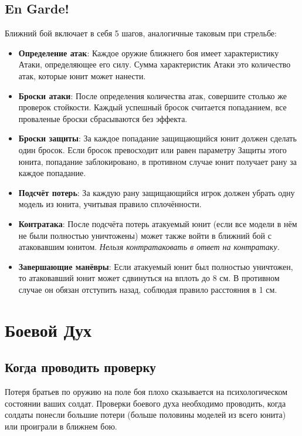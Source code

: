 \documentclass[twocolumn]{article}
\newcommand{\h}[1]{\textbf{#1}}
\begin{document}
\subsection{En Garde!}
Ближний бой включает в себя 5 шагов, аналогичные таковым при стрельбе:
\begin{itemize}
    \item \h{Определение атак}: Каждое оружие ближнего боя имеет характеристику Атаки, определяющее его силу. Сумма характеристик Атаки это количество атак, которые юнит может нанести.
    \item \h{Броски атаки}: После определения количества атак, совершите столько же проверок стойкости. Каждый успешный бросок считается попаданием, все проваленые броски сбрасываются без эффекта.
    \item \h{Броски защиты}: За каждое попадание защищающийся юнит должен сделать один бросок. Если бросок превосходит или равен параметру Защиты этого юнита, попадание заблокировано, в противном случае юнит получает рану за каждое попадание.
    \item \h{Подсчёт потерь}: За каждую рану защищающийся игрок должен убрать одну модель из юнита, учитывая правило сплочённости.
    \item \h{Контратака}: После подсчёта потерь атакуемый юнит (если все модели в нём не были полностью уничтожены) может также войти в ближний бой с атаковавшим юнитом. \emph{Нельзя контратаковать в ответ на контратаку.}
    \item \h{Завершающие манёвры}: Если атакуемый юнит был полностью уничтожен, то атаковавший юнит может сдвинуться на вплоть до 8 см. В противном случае он обязан отступить назад, соблюдая правило расстояния в 1 см.
\end{itemize}

\newpage

\section{Боевой Дух}
\subsection{Когда проводить проверку}
Потеря братьев по оружию на поле боя плохо сказывается на психологическом состоянии ваших солдат. Проверки боевого духа необходимо проводить, когда солдаты понесли большие потери (больше половины моделей из всего юнита) или проиграли в ближнем бою.
\end{document}
